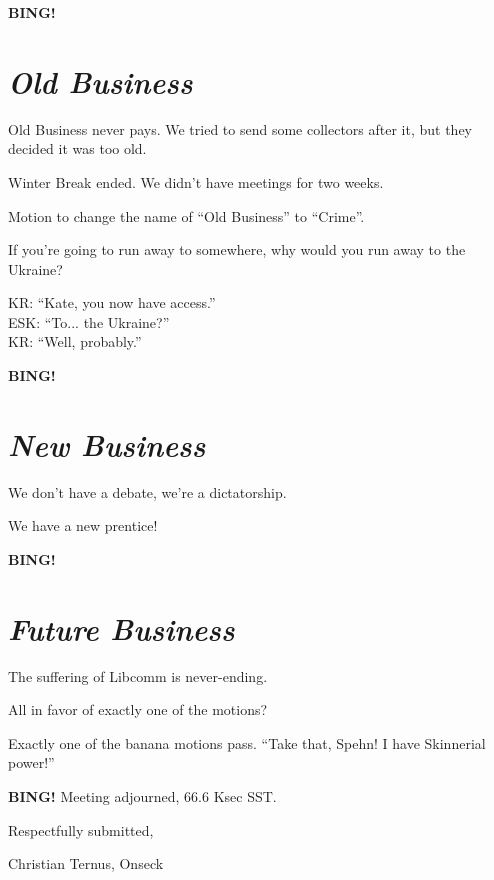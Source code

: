 \documentclass[10pt]{article}
\newcommand{\bing}{{\bf BING!} }
\newcommand{\goto}[1]{\bing \vskip 12pt \section*{{\em{#1}}}}
\begin{document}
\goto{Old Business}

Old Business never pays.  We tried to send some collectors after it,
but they decided it was too old.

Winter Break ended.  We didn't have meetings for two weeks.

Motion to change the name of ``Old Business'' to ``Crime''.

If you're going to run away to somewhere, why would you run away to the Ukraine?

KR: ``Kate, you now have access.''\\
ESK: ``To... the Ukraine?''\\
KR: ``Well, probably.''

\goto{New Business}

We don't have a debate, we're a dictatorship.

We have a new prentice!

\goto{Future Business}

The suffering of Libcomm is never-ending.

All in favor of exactly one of the motions?

Exactly one of the banana motions pass.  ``Take that, Spehn!  I have
Skinnerial power!''

\bing
\noindent
Meeting adjourned, 66.6 Ksec SST.

\vspace{18pt}

\centerline{Respectfully submitted,}
\centerline{Christian Ternus, Onseck}
\end{document}
